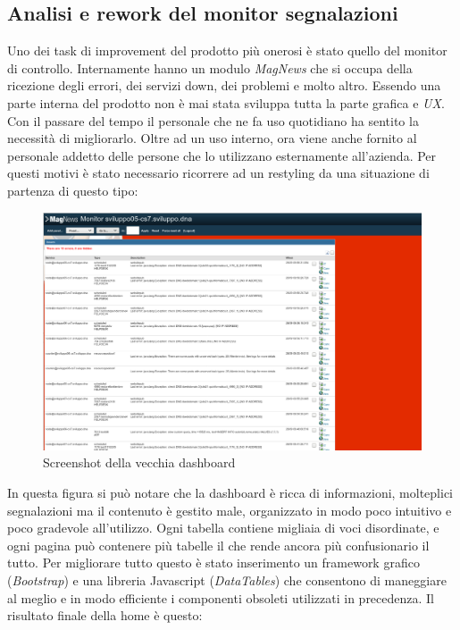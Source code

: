 \documentclass[a4paper]{article}
\begin{document}
\subsection{Analisi e rework del monitor segnalazioni}
\par Uno dei task di improvement del prodotto più onerosi è stato quello del monitor di controllo.
Internamente hanno un modulo \emph{MagNews} che si occupa della ricezione degli errori,
dei servizi down, dei problemi e molto altro. Essendo una parte interna del prodotto
non è mai stata sviluppa tutta la parte grafica e \emph{UX}. Con il passare del tempo
il personale che ne fa uso quotidiano ha sentito la necessità di migliorarlo.
Oltre ad un uso interno, ora viene anche fornito al personale addetto delle persone che
lo utilizzano esternamente all'azienda. Per questi motivi è stato necessario ricorrere ad un restyling
da una situazione di partenza di questo tipo:
\begin{figure}[H]
	\includegraphics[width=\textwidth]{dashboard_old.png}
	\centering
	\caption{Screenshot della vecchia dashboard}
\end{figure}
In questa figura si può notare che la dashboard è ricca di informazioni, molteplici segnalazioni
ma il contenuto è gestito male, organizzato in modo poco intuitivo e poco gradevole all'utilizzo.
Ogni tabella contiene migliaia di voci disordinate, e ogni pagina può contenere più tabelle
il che rende ancora più confusionario il tutto. Per migliorare tutto questo è stato inserimento
un framework grafico (\emph{Bootstrap}) e una libreria Javascript (\emph{DataTables}) che consentono
di maneggiare al meglio e in modo efficiente i componenti obsoleti utilizzati in precedenza.
Il risultato finale della home è questo:
\end{document}
